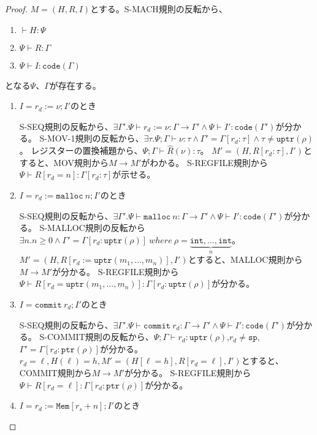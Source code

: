 \documentclass[a4paper,oneside]{ltjsarticle}
\newcommand{\code}[1]{\mathtt{code}(#1)}
\newcommand{\commit}[1]{\mathtt{commit}\ #1}
\newcommand{\Mem}[1]{\mathtt{Mem}[#1]}
\newcommand{\uptr}[1]{\mathtt{uptr}(#1)}
\newcommand{\ptr}[1]{\mathtt{ptr}(#1)}
\newcommand{\malloc}[1]{\mathtt{malloc}\ #1}
\newcommand{\Tint}{\mathtt{int}}
\begin{document}
\begin{proof}
    $M=\left(H,R,I\right)$とする。S-MACH規則の反転から、
    \begin{enumerate}
        \item $\vdash H:\Psi$
        \item $\Psi\vdash R:\Gamma$
        \item $\Psi\vdash I:\mathtt{code}(\Gamma)$
    \end{enumerate}

    となる$\Psi$、$\Gamma$が存在する。

    \begin{enumerate}
        \item $I=r_d:=\nu;I'$のとき

            S-SEQ規則の反転から、$\exists \Gamma'. \Psi\vdash r_d:=\nu:\Gamma\rightarrow\Gamma'\wedge \Psi\vdash I':\code{\Gamma'}$が分かる。
            S-MOV-1規則の反転から、$\exists \tau. \Psi;\Gamma\vdash \nu:\tau\wedge \Gamma'=\Gamma[r_d:\tau]\wedge \tau\neq \uptr{\rho}$。
            レジスターの置換補題から、$\Psi;\Gamma\vdash \hat{R}(\nu):\tau$。
            $M'=(H,R[r_d:\tau],I')$とすると、MOV規則から$M\rightarrow M'$がわかる。
            S-REGFILE規則から$\Psi\vdash R[r_d=n]:\Gamma[r_d:\tau]$が示せる。
        \item $I=r_d:=\malloc{n};I'$のとき

            S-SEQ規則の反転から、$\exists \Gamma'.\Psi\vdash \malloc{n}:\Gamma\rightarrow\Gamma'\wedge \Psi\vdash I':\code{\Gamma'}$が分かる。
            S-MALLOC規則の反転から$\exists n. n \geq 0 \wedge \Gamma'=\Gamma[r_d:\uptr{\rho}]\ where\ \rho=\underbrace{\Tint,\dots,\Tint}_n$。
            $M'=(H,R[r_d:=\uptr{m_1,\dots,m_n}], I')$とすると、MALLOC規則から$M\rightarrow M'$が分かる。
            S-REGFILE規則から$\Psi\vdash R[r_d=\uptr{m_1,\dots,m_n}]:\Gamma[r_d:\uptr{\rho}]$が分かる。
        \item $I=\commit{r_d};I'$のとき

            S-SEQ規則の反転から、$\exists \Gamma'. \Psi\vdash \commit{r_d}:\Gamma\rightarrow\Gamma' \wedge \Psi\vdash I':\code{\Gamma'}$が分かる。
            S-COMMIT規則の反転から、$\Psi;\Gamma\vdash r_d:\uptr{\rho}$,$r_d\neq \mathtt{sp}$, $\Gamma'=\Gamma[r_d:\ptr{\rho}]$が分かる。
            $r_d=\ell, H(\ell)=h, M'=(H[\ell=h],R[r_d=\ell],I')$とすると、COMMIT規則から$M\rightarrow M'$が分かる。
            S-REGFILE規則から$\Psi\vdash R[r_d=\ell]:\Gamma[r_d:\ptr{\rho}]$が分かる。
        \item $I=r_d:=\Mem{r_s+n};I'$のとき


\end{enumerate}
\end{proof}
\end{document}
